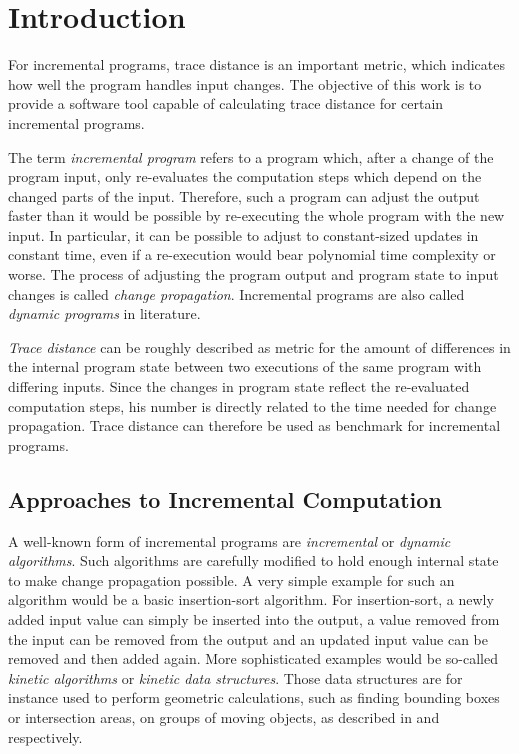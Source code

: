 
\chapter{Introduction}
\label{ch:Introduction}

For incremental programs, trace distance is an important metric, which indicates how well the program handles input changes. The objective of this work is to provide a software tool capable of calculating trace distance for certain incremental programs.  

The term \textit{incremental program} refers to a program which, after a change of the program input, only re-evaluates the computation steps which depend on the changed parts of the input. Therefore, such a program can adjust the output faster than it would be possible by re-executing the whole program with the new input. In particular, it can be possible to adjust to constant-sized updates in constant time, even if a re-execution would bear polynomial time complexity or worse. The process of adjusting the program output and program state to input changes is called \textit{change propagation}. Incremental programs are also called \textit{dynamic programs} in literature. 

\textit{Trace distance} can be roughly described as metric for the amount of differences in the internal program state between two executions of the same program with differing inputs. Since the changes in program state reflect the re-evaluated computation steps, his number is directly related to the time needed for change propagation. Trace distance can therefore be used as benchmark for incremental programs. 

\section{Approaches to Incremental Computation}


A well-known form of incremental programs are \textit{incremental} or \textit{dynamic algorithms}. Such algorithms are carefully modified to hold enough internal state to make change propagation possible. A very simple example for such an algorithm would be a basic insertion-sort algorithm. For insertion-sort, a newly added input value can simply be inserted into the output, a value removed from the input can be removed from the output and an updated input value can be removed and then added again. More sophisticated examples would be so-called \textit{kinetic algorithms} or \textit{kinetic data structures}. Those data structures are for instance used to perform geometric calculations, such as finding bounding boxes or intersection areas, on groups of moving objects, as described in \cite{yu2008practical} and \cite{basch2004kinetic} respectively.

